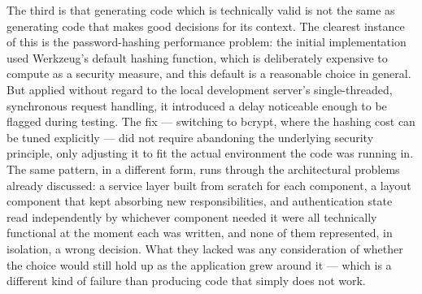 The third is that generating code which is technically valid is not the same as generating code that makes good decisions for its context. The clearest instance of this is the password-hashing performance problem: the initial implementation used Werkzeug's default hashing function, which is deliberately expensive to compute as a security measure, and this default is a reasonable choice in general. But applied without regard to the local development server's single-threaded, synchronous request handling, it introduced a delay noticeable enough to be flagged during testing. The fix --- switching to bcrypt, where the hashing cost can be tuned explicitly --- did not require abandoning the underlying security principle, only adjusting it to fit the actual environment the code was running in. The same pattern, in a different form, runs through the architectural problems already discussed: a service layer built from scratch for each component, a layout component that kept absorbing new responsibilities, and authentication state read independently by whichever component needed it were all technically functional at the moment each was written, and none of them represented, in isolation, a wrong decision. What they lacked was any consideration of whether the choice would still hold up as the application grew around it --- which is a different kind of failure than producing code that simply does not work.

